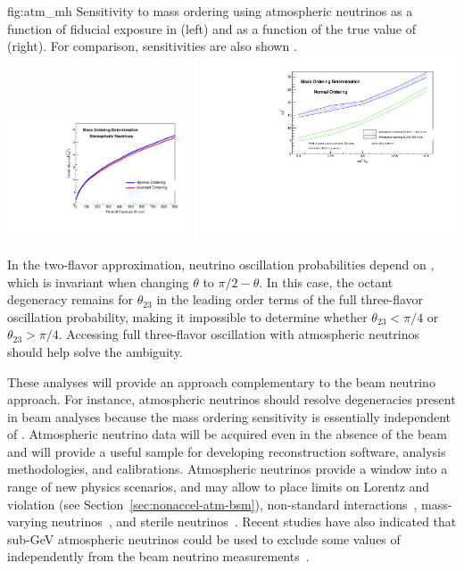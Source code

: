 \begin{dunefigure}
{fig:atm_mh}
{Sensitivity to mass ordering using atmospheric neutrinos as a function of fiducial exposure in  (left) and as a function of the true value of  (right).  For comparison, \hyperk sensitivities are also shown \cite{Abe:2018uyc}.}
\includegraphics[width=0.41\textwidth]{graphics/atm_mh_vs_exposure.pdf}
\includegraphics[width=0.58\textwidth]{graphics/MHS_DUNEvsHK.pdf}
\end{dunefigure}

In the two-flavor approximation, neutrino oscillation probabilities depend on 
\sinst, which is invariant when changing $\theta$ to $\pi/2-\theta$. In this case, the octant degeneracy remains for $\theta_{23}$ in the leading order terms of the full 
three-flavor oscillation probability, making it impossible to determine whether $\theta_{23}< \pi/4$ or 
$\theta_{23}> \pi/4$. Accessing full three-flavor oscillation with atmospheric neutrinos 
should help solve the ambiguity.


These analyses will provide an approach complementary to the beam neutrino approach. For instance, atmospheric neutrinos should resolve  degeneracies present in beam analyses because the mass ordering sensitivity is essentially independent of \deltacp. Atmospheric neutrino data will be acquired 
even in the absence of the beam and will provide a useful sample for developing reconstruction software, analysis methodologies, and calibrations.  Atmospheric neutrinos provide a window into a range of new physics scenarios, and may allow  to place limits on Lorentz and  violation (see Section~\ref{sec:nonaccel-atm-bsm}), 
non-standard interactions~\cite{Chatterjee:2014gxa}, mass-varying neutrinos~\cite{Abe:2008zza}, and
sterile neutrinos~\cite{Abe:2014gda}.
Recent studies have also indicated that sub-GeV atmospheric neutrinos could be used to exclude some values of \deltacp independently from the beam neutrino measurements~\cite{Kelly:2019itm}.

